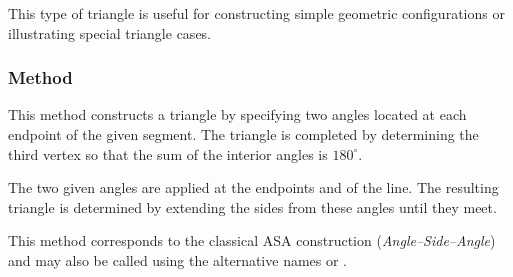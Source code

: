 \medskip

This type of triangle is useful for constructing simple geometric configurations or illustrating special triangle cases.

\vspace{1em}
\begin{minipage}{.5\textwidth}
\begin{center}
\end{center}

\end{minipage}
\begin{minipage}{.5\textwidth}
\begin{tkzexample}
\end{tkzexample}
\end{minipage}

\subsubsection{Method }
\label{ssub:triangle_with_two__angles}

This method constructs a triangle by specifying two angles located at each endpoint of the given segment. The triangle is completed by determining the third vertex so that the sum of the interior angles is $180^\circ$.

\medskip

The two given angles are applied at the endpoints  and  of the line. The resulting triangle is determined by extending the sides from these angles until they meet.

\medskip

This method corresponds to the classical ASA construction (\textit{Angle–Side–Angle}) and may also be called using the alternative names  or .

\vspace{1em}

